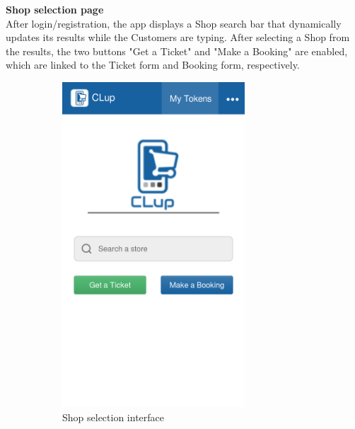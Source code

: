 \textbf{Shop selection page}\\
\label{page:home}
After login/registration, the app displays a Shop search bar that dynamically updates its results while the Customers are typing. After selecting a Shop from the results, the two buttons "Get a Ticket" and "Make a Booking" are enabled, which are linked to the Ticket form and Booking form, respectively.
\begin{figure}[H]
    \begin{subfigure}{0.5\textwidth}
        \centering
        \includegraphics[width=0.75\textwidth]{Images/home-mockup.png}
        \caption{Shop selection interface}
    \end{subfigure}%
    \begin{subfigure}{0.5\textwidth}
        \centering

\end{subfigure}
\end{figure}
